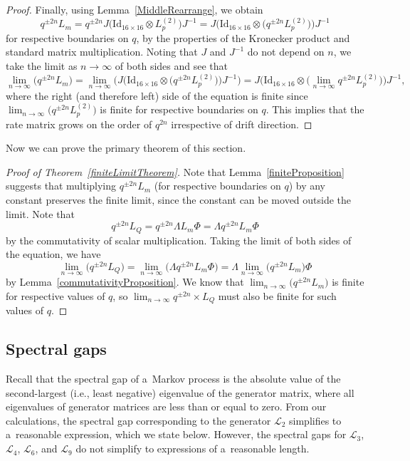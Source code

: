 \documentclass[pdftex]{sigma}
\numberwithin{equation}{section}
\theoremstyle{definition}
\begin{document}
\begin{proof}
Finally, using Lemma~\ref{MiddleRearrange}, we obtain
\[q^{\pm 2n} L_m = q^{\pm 2n}J\bigl(\textrm{Id}_{16 \times 16} \otimes L^{(2)}_p\bigr)J^{-1} = J\bigl(\textrm{Id}_{16 \times 16} \otimes \bigl(q^{\pm 2n} L^{(2)}_p\bigr)\bigr)J^{-1}\] for respective boundaries on $q$, by the properties of the Kronecker product and standard matrix multiplication. Noting that $J$ and $J^{-1}$ do not depend on $n$, we take the limit as $n \to \infty$ of both sides and see that \[\lim_{n \to \infty} \bigl(q^{\pm 2n} L_m\bigr) = \lim_{n \to \infty} \bigl(J\bigl(\textrm{Id}_{16 \times 16} \otimes \bigl(q^{\pm 2n} L^{(2)}_p\bigr)\bigr)J^{-1}\bigr) = J\bigl(\textrm{Id}_{16 \times 16} \otimes \bigl(\lim_{n \to \infty} q^{\pm 2n} L^{(2)}_p\bigr)\bigr)J^{-1},\] where the right (and therefore left) side of the equation is finite since $\lim_{n \to \infty} \bigl(q^{\pm 2n} L^{(2)}_p\bigr)$ is finite for respective boundaries on $q$. This implies that the rate matrix grows on the order of $q^{2n}$ irrespective of drift direction.
\end{proof}

Now we can prove the primary theorem of this section.

\begin{proof}[Proof of Theorem~\ref{finiteLimitTheorem}]
\label{finite_theorem_proof}
Note that Lemma~\ref{finiteProposition} suggests that multiplying $q^{\pm 2n} L_m$ (for respective boundaries on $q$) by any constant preserves the finite limit, since the constant can be moved outside the limit. Note that
\[
q^{\pm 2n} L_Q = q^{\pm 2n} \Lambda L_m \Phi = \Lambda q^{\pm 2n} L_m \Phi
\]
 by the commutativity of scalar multiplication. Taking the limit of both sides of the equation, we have
\[
\lim_{n \to \infty} \bigl(q^{\pm 2n} L_Q\bigr) = \lim_{n \to \infty} \bigl(\Lambda q^{\pm 2n} L_m \Phi\bigr) = \Lambda \lim_{n \to \infty} \bigl(q^{\pm 2n} L_m\bigr) \Phi
\]
 by Lemma~\ref{commutativityProposition}. We know that $\lim_{n \to \infty} \bigl(q^{\pm 2n} \!L_m\bigr)$ is finite for respective values of $q$, so $\lim_{n \to \infty}\! q^{\pm 2n}\allowbreak\times L_Q$ must also be finite for such values of $q$.
\end{proof}

\subsection{Spectral gaps}

Recall that the spectral gap of a~Markov process is the absolute value of the second-largest (i.e., least negative) eigenvalue of the generator matrix, where all eigenvalues of generator matrices are less than or equal to zero. From our calculations, the spectral gap corresponding to the generator $\mathcal{L}_2$ simplifies to a~reasonable expression, which we state below. However, the spectral gaps for $\mathcal{L}_3$, $\mathcal{L}_4$, $\mathcal{L}_6$, and $\mathcal{L}_9$ do not simplify to expressions of a~reasonable length.
\end{document}

